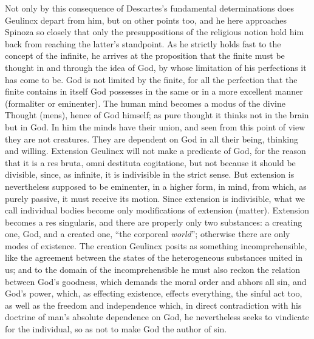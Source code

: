 Not only by this consequence of Descartes's fundamental determinations
does Geulincx depart from him, but on other points too, and he here
approaches Spinoza so closely that only the presuppositions of the
religious notion hold him back from reaching the latter's standpoint. As
he strictly holds fast to the concept of the infinite, he arrives at the
proposition that the finite must be thought in and through the idea of
God, by whose limitation of his perfections it has come to be. God is
not limited by the finite, for all the perfection that the finite
contains in itself God possesses in the same or in a more excellent
manner (formaliter or eminenter). The human mind becomes a modus of
the divine Thought (mens), hence of God himself; as pure thought it
thinks not in the brain but in God. In him the minds have their union,
and seen from this point of view they are not creatures. They are
dependent on God in all their being, thinking and willing. Extension
Geulincx will not make a predicate of God, for the reason that it is a
res bruta, omni destituta cogitatione, but not because it should be
divisible, since, as infinite, it is indivisible in the strict sense.
But extension is nevertheless supposed to be eminenter, in a higher
form, in mind, from which, as purely passive, it must receive its
motion. Since extension is indivisible, what we call individual bodies
become only modifications of extension (matter). Extension becomes a res
singularis, and there are properly only two substances: a
creating one, God, and a created one, ``the corporeal \emph{world}'';
otherwise there are only modes of existence. The creation Geulincx
posits as something incomprehensible, like the agreement between the
states of the heterogeneous substances united in us; and to the domain
of the incomprehensible he must also reckon the relation between God's
goodness, which demands the moral order and abhors all sin, and God's
power, which, as effecting existence, effects everything, the sinful act
too, as well as the freedom and independence which, in direct
contradiction with his doctrine of man's absolute dependence on God, he
nevertheless seeks to vindicate for the individual, so as not to make
God the author of sin.

\divrule

